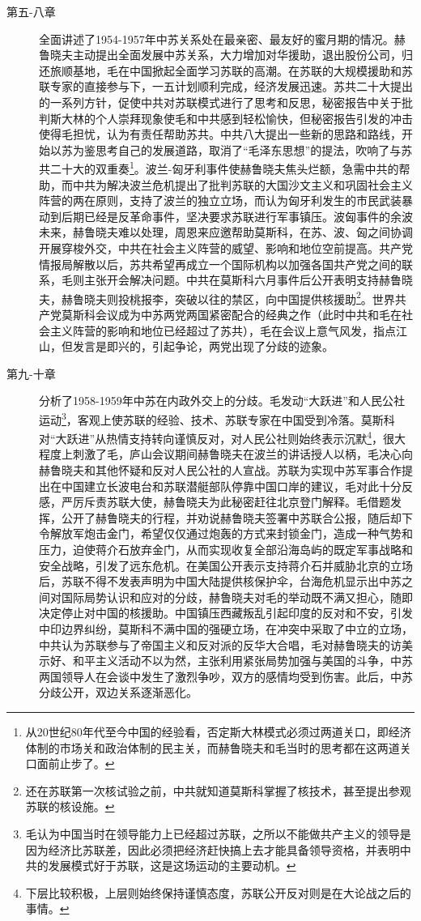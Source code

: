 \begin{description}
    \item[第五-八章] 全面讲述了1954-1957年中苏关系处在最亲密、最友好的蜜月期的情况。赫鲁晓夫主动提出全面发展中苏关系，大力增加对华援助，退出股份公司，归还旅顺基地，毛在中国掀起全面学习苏联的高潮。在苏联的大规模援助和苏联专家的直接参与下，一五计划顺利完成，经济发展迅速。苏共二十大提出的一系列方针，促使中共对苏联模式进行了思考和反思，秘密报告中关于批判斯大林的个人崇拜现象使毛和中共感到轻松愉快，但秘密报告引发的冲击使得毛担忧，认为有责任帮助苏共。中共八大提出一些新的思路和路线，开始以苏为鉴思考自己的发展道路，取消了“毛泽东思想”的提法，吹响了与苏共二十大的双重奏\footnote{从20世纪80年代至今中国的经验看，否定斯大林模式必须过两道关口，即经济体制的市场关和政治体制的民主关，而赫鲁晓夫和毛当时的思考都在这两道关口面前止步了。}。波兰-匈牙利事件使赫鲁晓夫焦头烂额，急需中共的帮助，而中共为解决波兰危机提出了批判苏联的大国沙文主义和巩固社会主义阵营的两在原则，支持了波兰的独立立场，而认为匈牙利发生的市民武装暴动到后期已经是反革命事件，坚决要求苏联进行军事镇压。波匈事件的余波未来，赫鲁晓夫难以处理，周恩来应邀帮助莫斯科，在苏、波、匈之间协调开展穿梭外交，中共在社会主义阵营的威望、影响和地位空前提高。共产党情报局解散以后，苏共希望再成立一个国际机构以加强各国共产党之间的联系，毛则主张开会解决问题。中共在莫斯科六月事件后公开表明支持赫鲁晓夫，赫鲁晓夫则投桃报李，突破以往的禁区，向中国提供核援助\footnote{还在苏联第一次核试验之前，中共就知道莫斯科掌握了核技术，甚至提出参观苏联的核设施。}。世界共产党莫斯科会议成为中苏两党两国紧密配合的经典之作（此时中共和毛在社会主义阵营的影响和地位已经超过了苏共），毛在会议上意气风发，指点江山，但发言是即兴的，引起争论，两党出现了分歧的迹象。
    \item[第九-十章] 分析了1958-1959年中苏在内政外交上的分歧。毛发动“大跃进”和人民公社运动\footnote{毛认为中国当时在领导能力上已经超过苏联，之所以不能做共产主义的领导是因为经济比苏联差，因此必须把经济赶快搞上去才能具备领导资格，并表明中共的发展模式好于苏联，这是这场运动的主要动机。}，客观上使苏联的经验、技术、苏联专家在中国受到冷落。莫斯科对“大跃进”从热情支持转向谨慎反对，对人民公社则始终表示沉默\footnote{下层比较积极，上层则始终保持谨慎态度，苏联公开反对则是在大论战之后的事情。}，很大程度上刺激了毛，庐山会议期间赫鲁晓夫在波兰的讲话授人以柄，毛决心向赫鲁晓夫和其他怀疑和反对人民公社的人宣战。苏联为实现中苏军事合作提出在中国建立长波电台和苏联潜艇部队停靠中国口岸的建议，毛对此十分反感，严厉斥责苏联大使，赫鲁晓夫为此秘密赶往北京登门解释。毛借题发挥，公开了赫鲁晓夫的行程，并劝说赫鲁晓夫签署中苏联合公报，随后却下令解放军炮击金门，希望仅仅通过炮轰的方式来封锁金门，造成一种气势和压力，迫使蒋介石放弃金门，从而实现收复全部沿海岛屿的既定军事战略和安全战略，引发了远东危机。在美国公开表示支持蒋介石并威胁北京的立场后，苏联不得不发表声明为中国大陆提供核保护伞，台海危机显示出中苏之间对国际局势认识和应对的分歧，赫鲁晓夫对毛的举动既不满又担心，随即决定停止对中国的核援助。中国镇压西藏叛乱引起印度的反对和不安，引发中印边界纠纷，莫斯科不满中国的强硬立场，在冲突中采取了中立的立场，中共认为苏联参与了帝国主义和反对派的反华大合唱，毛对赫鲁晓夫的访美示好、和平主义活动不以为然，主张利用紧张局势加强与美国的斗争，中苏两国领导人在会谈中发生了激烈争吵，双方的感情均受到伤害。此后，中苏分歧公开，双边关系逐渐恶化。
\end{description}

